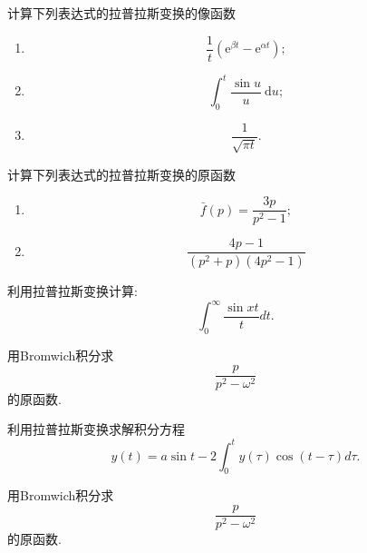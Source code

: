 \documentclass[10pt]{article}
\newenvironment{problem}[2][]{\begin{trivlist}
\item[\hskip \labelsep {\bfseries #1}\hskip \labelsep {\bfseries #2}]}{\end{trivlist}}
\begin{document}
\renewcommand{\labelenumi}{(\arabic{enumi})}
\renewcommand{\labelenumii}{(\arabic{enumi}.\arabic{enumii})}



 




\begin{problem}{6.1}
  计算下列表达式的拉普拉斯变换的像函数
  \begin{enumerate}
    \item $$
    \frac{1}{t}\left(\mathrm{e}^{\beta t}-\mathrm{e}^{\alpha t}\right) ;
    $$
    \item $$
    \int_0^t \frac{\sin u}{u} \mathrm{~d} u;
    $$
    \item 
    $$
    \frac{1}{\sqrt{\pi t}}.
    $$
  \end{enumerate}
\end{problem}

\begin{problem}{6.2}
  计算下列表达式的拉普拉斯变换的原函数
  \begin{enumerate}
    \item $$
    \bar{f}(p)=\frac{3 p}{p^2-1} ;
    $$
    \item $$
    \frac{4 p-1}{\left(p^2+p\right)\left(4 p^2-1\right)}
    $$
  \end{enumerate}
\end{problem}
  
\begin{problem}{6.3}
  利用拉普拉斯变换计算:  $$\int_0^{\infty} \frac{\sin x t}{t} dt. $$
\end{problem}
   
\begin{problem}{6.4}
用Bromwich积分求
$$
\frac{p}{p^2 - \omega^2}
$$
的原函数.
\end{problem}

\begin{problem}{6.5}
  利用拉普拉斯变换求解积分方程
  $$
  y(t)=a \sin t-2 \int_0^t y(\tau) \cos (t-\tau) d \tau .
  $$
\end{problem}

\begin{problem}{6.6}
  用Bromwich积分求
  $$
  \frac{p}{p^2 - \omega^2}
  $$
  的原函数.
\end{problem}
\end{document}
